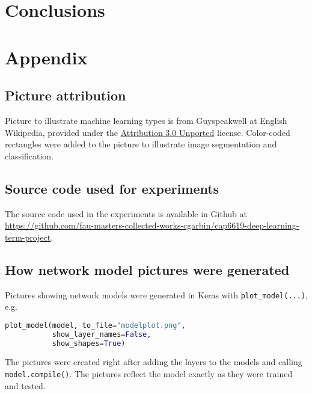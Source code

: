 \documentclass[conference]{IEEEtran}
\begin{document}
\section{Conclusions}



\printbibliography

\section{Appendix}

\subsection{Picture attribution}

Picture to illustrate machine learning types is from Guyspeakwell at English Wikipedia, provided under the \href{https://creativecommons.org/licenses/by/3.0/deed.en}{Attribution 3.0 Unported} license. Color-coded rectangles were added to the picture to illustrate image segmentation and classification.

\subsection{Source code used for experiments}

The source code used in the experiments is available in Github at \url{https://github.com/fau-masters-collected-works-cgarbin/cap6619-deep-learning-term-project}.

\subsection{How network model pictures were generated}

Pictures showing network models were generated in Keras with \verb|plot_model(...)|, e.g. 

\begin{lstlisting}[language=Python]
plot_model(model, to_file="modelplot.png",
           show_layer_names=False,
           show_shapes=True)
\end{lstlisting}

The pictures were created right after adding the layers to the models and calling \verb|model.compile()|. The pictures reflect the model exactly as they were trained and tested.
\end{document}
